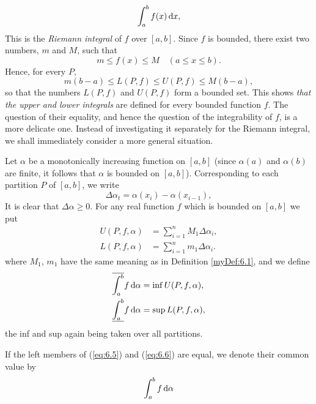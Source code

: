 \begin{myDef}
\begin{equation}
        \label{eq:6.4}
        \int_{a}^{b} f(x) \d x,
    \end{equation}
    This is the \emph{Riemann integral} of $f$ over $[a, b]$. 
    Since $f$ is bounded, there exist two numbers, $m$ and $M$, such that
    \begin{equation*}
        m \leq f(x) \leq M \quad 
        (a \leq x \leq b).
    \end{equation*}
    Hence, for every $P$,
    \begin{equation*}
        m(b - a) \leq L(P,f) \leq U(P,f) \leq M(b - a),
    \end{equation*}
    so that the numbers $L(P,f)$ and $U(P,f)$ form a bounded set. 
    This shows \emph{that the upper and lower integrals} are defined for every bounded function $f$.
    The question of their equality, 
    and hence the question of the integrability of $f$, is a more delicate one. 
    Instead of investigating it separately for the Riemann integral,
    we shall immediately consider a more general situation.
\end{myDef}

\begin{myDef}
    \label{myDef:6.2}
    Let $\alpha$ be a monotonically increasing function on $[a, b]$ 
    (since $\alpha (a)$ and $\alpha (b)$ are finite, 
    it follows that $\alpha$ is bounded on $[a, b]$). 
    Corresponding to each partition $P$ of $[a, b]$, 
    we write
    \begin{equation*}
        \Delta \alpha_t = \alpha (x_{i}) - \alpha (x_{i-1}),        
    \end{equation*}
    It is clear that $\Delta \alpha \geq 0$. 
    For any real function $f$ which is bounded on $[a, b]$
    we put
    \begin{align*}
        U(P, f, \alpha) &= \sum_{i=1}^{n} M_1 \Delta \alpha_i, \\
        L(P, f, \alpha) &= \sum_{i=1}^{n} m_1 \Delta \alpha_i. 
    \end{align*}
    where $M_1$, $m_1$ have the same meaning as in Definition \ref{myDef:6.1}, 
    and we define
    \begin{align}
        \label{eq:6.5}
        \overline{\int_{a}^{b}} f \d \alpha &= \inf U(P, f, \alpha), \\
        \label{eq:6.6}
        \underline{\int_{a}^{b}} f \d \alpha &= \sup L(P, f, \alpha),
    \end{align}
    the inf and sup again being taken over all partitions.

    If the left members of (\ref{eq:6.5}) and (\ref{eq:6.6}) are equal, 
    we denote their common value by
    \begin{equation}
        \label{eq:6.7}
        \int_{a}^{b} f \d \alpha
    \end{equation}
\end{myDef}

